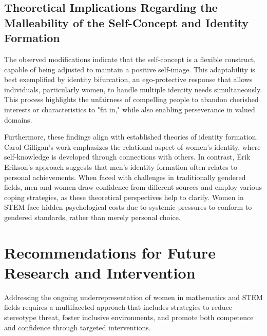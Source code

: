 \subsection{Theoretical Implications Regarding the Malleability of the Self-Concept and Identity Formation}
The observed modifications indicate that the self-concept is a flexible construct, capable of being adjusted to maintain a positive self-image. This adaptability is best exemplified by identity bifurcation, an ego-protective response that allows individuals, particularly women, to handle multiple identity needs simultaneously. This process highlights the unfairness of compelling people to abandon cherished interests or characteristics to "fit in," while also enabling perseverance in valued domains.

Furthermore, these findings align with established theories of identity formation. Carol Gilligan's work emphasizes the relational aspect of women's identity, where self-knowledge is developed through connections with others. In contrast, Erik Erikson's approach suggests that men's identity formation often relates to personal achievements. When faced with challenges in traditionally gendered fields, men and women draw confidence from different sources and employ various coping strategies, as these theoretical perspectives help to clarify. Women in STEM face hidden psychological costs due to systemic pressures to conform to gendered standards, rather than merely personal choice. 

\section{Recommendations for Future Research and Intervention}
Addressing the ongoing underrepresentation of women in mathematics and STEM fields requires a multifaceted approach that includes strategies to reduce stereotype threat, foster inclusive environments, and promote both competence and confidence through targeted interventions.
